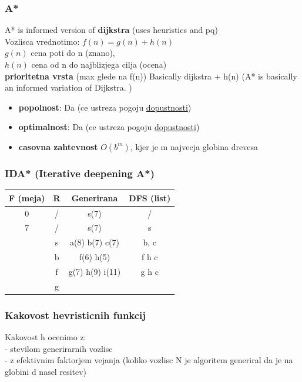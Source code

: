 \subsubsection{A*}
A* is informed version of \textbf{dijkstra} (uses heuristics and pq)\\
Vozlisca vrednotimo: $f(n)=g(n)+h(n)$\\ 
$g(n)$ cena poti do n (znano),\\ 
$h(n)$ cena od n do najblizjega cilja (ocena)\\
\textbf{prioritetna vrsta} (max glede na f(n))
Basically dijkstra + h(n) (A* is basically an informed variation of Dijkstra.
)
\begin{itemize}[noitemsep,topsep=0pt,leftmargin=*]
    \item \textbf{popolnost}: Da (ce ustreza pogoju \underline{dopustnosti})
    \item \textbf{optimalnost}: Da (ce ustreza pogoju \underline{dopustnosti}) 
    \item \textbf{casovna zahtevnost} $O(b^m)$, kjer je m najvecja globina drevesa
\end{itemize}


\subsubsection{IDA* (Iterative deepening A*)}
\begin{tabular}{c|c|c|c}
    F (meja) & R & Generirana & DFS (list)\\
    \hline
    0 & / & s(7) & /\\
    \hline
    7 & / & s(7) & s \\
      & s & a(8) b(7) c(7) & b, c\\
      & b & f(6) h(5) & f h c\\
      & f & g(7) h(9) i(11) & g h c\\
      & \underline{g} &  & 
\end{tabular}



\subsubsection{Kakovost hevristicnih funkcij}

Kakovost h ocenimo z:\\
- stevilom generirarnih vozlisc\\
- z efektivnim faktorjem vejanja (koliko vozlisc N je algoritem generiral da je na globini d nasel resitev)\\

